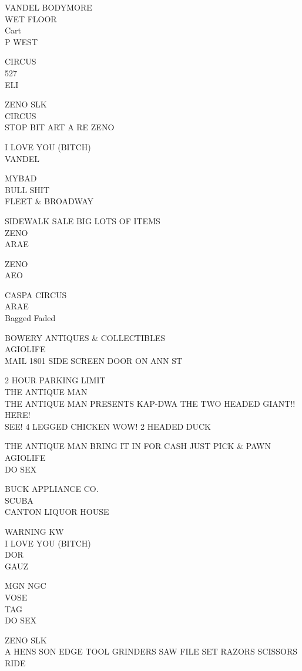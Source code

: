 \documentclass[10pt,letterpaper]{article}
\begin{document}
VANDEL BODYMORE\\
WET FLOOR\\
Cart\\
P WEST

CIRCUS\\
527\\
ELI

ZENO SLK\\
CIRCUS\\
STOP BIT ART A RE ZENO

I LOVE YOU (BITCH)\\
VANDEL

MYBAD\\
BULL SHIT\\
FLEET \& BROADWAY

SIDEWALK SALE BIG LOTS OF ITEMS\\
ZENO\\
ARAE

ZENO\\
AEO

CASPA CIRCUS\\
ARAE\\
Bagged Faded

BOWERY ANTIQUES \& COLLECTIBLES\\
AGIOLIFE\\
MAIL 1801 SIDE SCREEN DOOR ON ANN ST

2 HOUR PARKING LIMIT\\
THE ANTIQUE MAN\\
THE ANTIQUE MAN PRESENTS KAP{-}DWA THE TWO HEADED GIANT!! HERE!\\
SEE! 4 LEGGED CHICKEN WOW! 2 HEADED DUCK

THE ANTIQUE MAN BRING IT IN FOR CASH JUST PICK \& PAWN\\
AGIOLIFE\\
DO SEX

BUCK APPLIANCE CO.\\
SCUBA\\
CANTON LIQUOR HOUSE

WARNING KW\\
I LOVE YOU (BITCH)\\
DOR\\
GAUZ

MGN NGC\\
VOSE\\
TAG\\
DO SEX

ZENO SLK\\
A HENS SON EDGE TOOL GRINDERS SAW FILE SET RAZORS SCISSORS\\
RIDE
\end{document}
